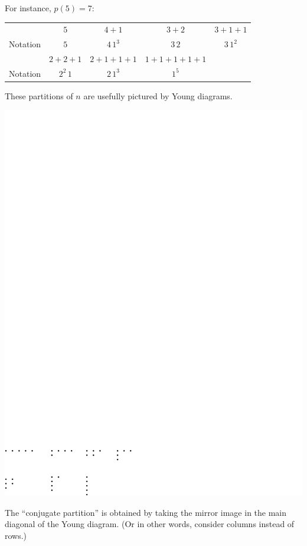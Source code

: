 \documentclass{notes}
\theoremstyle{plain}
\begin{document}
For instance, $p(5) = 7$:
\begin{center}
\begin{tabular}{r | c c c c }
         & $5$ & $4 + 1$ & $3 + 2$ & $3 + 1 + 1$  \\
Notation & $5$ & $4\,1^3$ & $3\,2$ & $3\, 1^2$ \\ \hline
         & $2 + 2 + 1$ & $2 + 1 + 1 + 1$ & $1+1+1+1+1$ \\
Notation & $2^2\, 1$ & $2\, 1^3$ & $ 1^5$
\end{tabular}
\end{center}

These partitions of $n$ are usefully pictured by Young diagrams.

\begin{center}
\includegraphics{yd}
\end{center}

The ``conjugate partition'' is obtained by taking the mirror image in
the main diagonal of the Young diagram.  (Or in other words, consider columns
instead of rows.)
\end{document}
